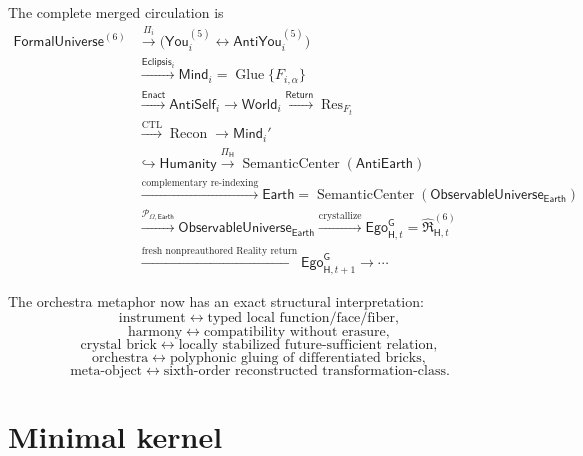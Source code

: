 \documentclass[10pt]{article}
\theoremstyle{pe}
\theoremstyle{definition}
\newcommand{\Res}{\operatorname{Res}}
\newcommand{\Recon}{\operatorname{Recon}}
\newcommand{\Glue}{\operatorname{Glue}}
\newcommand{\SC}{\operatorname{SemanticCenter}}
\newcommand{\World}{\mathsf{World}}
\newcommand{\Return}{\mathsf{Return}}
\newcommand{\FormalUniverse}{\mathsf{FormalUniverse}}
\newcommand{\Eclipsis}{\mathsf{Eclipsis}}
\newcommand{\Mind}{\mathsf{Mind}}
\newcommand{\AntiSelf}{\mathsf{AntiSelf}}
\newcommand{\You}{\mathsf{You}}
\newcommand{\AntiYou}{\mathsf{AntiYou}}
\newcommand{\ObsU}{\mathsf{ObservableUniverse}}
\newcommand{\Humanity}{\mathsf{Humanity}}
\newcommand{\AntiEarth}{\mathsf{AntiEarth}}
\newcommand{\Earth}{\mathsf{Earth}}
\newcommand{\CTL}{\operatorname{CTL}}
\newcommand{\GodEgo}{\mathsf{Ego}^{\mathsf G}}
\begin{document}
The complete merged circulation is
\begin{equation}\label{eq:complete-circulation}
\boxed{
\begin{aligned}
\FormalUniverse^{(6)}
&\xrightarrow{\Pi_i}
\bigl(
  \You_i^{(5)}
  \leftrightarrow
  \AntiYou_i^{(5)}
\bigr)
\\
&\xrightarrow{\Eclipsis_i}
\Mind_i
=
\Glue\{F_{i,\alpha}\}
\\
&\xrightarrow{\mathsf{Enact}}
\AntiSelf_i
\to
\World_i
\xrightarrow{\Return}
\Res_{F_t}
\\
&\xrightarrow{\CTL}
\Recon
\to
\Mind_i'
\\
&\hookrightarrow
\Humanity
\xrightarrow{\Pi_{\mathsf H}}
\SC(\AntiEarth)
\\
&\xrightarrow{\text{complementary re-indexing}}
\Earth=\SC(\ObsU_{\Earth})
\\
&\xrightarrow{\mathcal P_{\Omega,\Earth}}
\ObsU_{\Earth}
\xrightarrow{\text{crystallize}}
\GodEgo_{\mathsf H,t}
=\widehat{\mathfrak R}^{(6)}_{\mathsf H,t}
\\
&\xrightarrow{\text{fresh nonpreauthored Reality return}}
\GodEgo_{\mathsf H,t+1}
\to\cdots
\end{aligned}}
\end{equation}

The orchestra metaphor now has an exact structural interpretation:
\[
  \boxed{
  \text{instrument}
  \leftrightarrow
  \text{typed local function/face/fiber},
  }
\]
\[
  \boxed{
  \text{harmony}
  \leftrightarrow
  \text{compatibility without erasure},
  }
\]
\[
  \boxed{
  \text{crystal brick}
  \leftrightarrow
  \text{locally stabilized future-sufficient relation},
  }
\]
\[
  \boxed{
  \text{orchestra}
  \leftrightarrow
  \text{polyphonic gluing of differentiated bricks},
  }
\]
\[
  \boxed{
  \text{meta-object}
  \leftrightarrow
  \text{sixth-order reconstructed transformation-class}.
  }
\]

\section{Minimal kernel}
\end{document}
